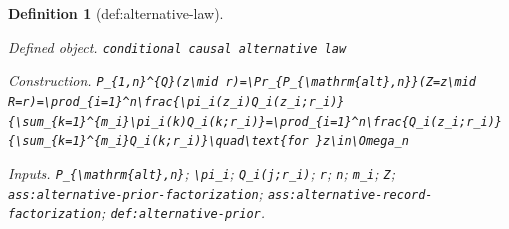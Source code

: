 \documentclass{article}
\newtheorem{definition}{Definition}
\begin{document}
\begin{definition}[def:alternative-law]\label{def:alternative-law}
\par\smallskip\noindent\emph{Defined object.} \texttt{conditional causal alternative law}
\par\smallskip\noindent\emph{Construction.} \texttt{P\_\allowbreak{}\{1,\allowbreak{}n\}\allowbreak{}\textasciicircum{}\{Q\}\allowbreak{}(z\textbackslash{}\allowbreak{}mid r)=\allowbreak{}\textbackslash{}\allowbreak{}Pr\_\allowbreak{}\{P\_\allowbreak{}\{\textbackslash{}\allowbreak{}mathrm\{alt\}\allowbreak{},\allowbreak{}n\}\allowbreak{}\}\allowbreak{}(Z=\allowbreak{}z\textbackslash{}\allowbreak{}mid R=\allowbreak{}r)=\allowbreak{}\textbackslash{}\allowbreak{}prod\_\allowbreak{}\{i=\allowbreak{}1\}\allowbreak{}\textasciicircum{}n\textbackslash{}\allowbreak{}frac\{\textbackslash{}\allowbreak{}pi\_\allowbreak{}i(z\_\allowbreak{}i)Q\_\allowbreak{}i(z\_\allowbreak{}i;\allowbreak{}r\_\allowbreak{}i)\}\allowbreak{}\{\textbackslash{}\allowbreak{}sum\_\allowbreak{}\{k=\allowbreak{}1\}\allowbreak{}\textasciicircum{}\{m\_\allowbreak{}i\}\allowbreak{}\textbackslash{}\allowbreak{}pi\_\allowbreak{}i(k)Q\_\allowbreak{}i(k;\allowbreak{}r\_\allowbreak{}i)\}\allowbreak{}=\allowbreak{}\textbackslash{}\allowbreak{}prod\_\allowbreak{}\{i=\allowbreak{}1\}\allowbreak{}\textasciicircum{}n\textbackslash{}\allowbreak{}frac\{Q\_\allowbreak{}i(z\_\allowbreak{}i;\allowbreak{}r\_\allowbreak{}i)\}\allowbreak{}\{\textbackslash{}\allowbreak{}sum\_\allowbreak{}\{k=\allowbreak{}1\}\allowbreak{}\textasciicircum{}\{m\_\allowbreak{}i\}\allowbreak{}Q\_\allowbreak{}i(k;\allowbreak{}r\_\allowbreak{}i)\}\allowbreak{}\textbackslash{}\allowbreak{}quad\textbackslash{}\allowbreak{}text\{for \}\allowbreak{}z\textbackslash{}\allowbreak{}in\textbackslash{}\allowbreak{}Omega\_\allowbreak{}n}
\par\smallskip\noindent\emph{Inputs.} \texttt{P\_\allowbreak{}\{\textbackslash{}\allowbreak{}mathrm\{alt\}\allowbreak{},\allowbreak{}n\}\allowbreak{}}; \texttt{\textbackslash{}\allowbreak{}pi\_\allowbreak{}i}; \texttt{Q\_\allowbreak{}i(j;\allowbreak{}r\_\allowbreak{}i)}; \texttt{r}; \texttt{n}; \texttt{m\_\allowbreak{}i}; \texttt{Z}; \texttt{ass:\allowbreak{}alternative-\allowbreak{}prior-\allowbreak{}factorization}; \texttt{ass:\allowbreak{}alternative-\allowbreak{}record-\allowbreak{}factorization}; \texttt{def:\allowbreak{}alternative-\allowbreak{}prior}.
\end{definition}
\end{document}
